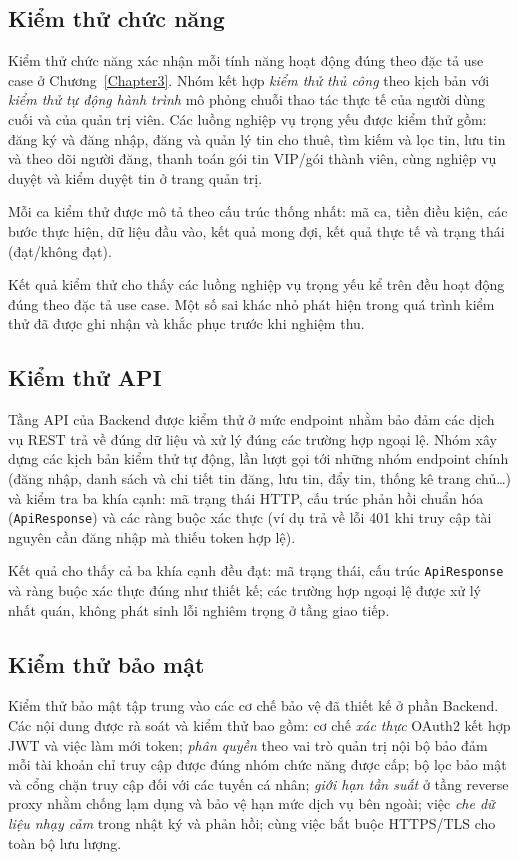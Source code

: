 \FloatBarrier
\subsection{Kiểm thử chức năng}

Kiểm thử chức năng xác nhận mỗi tính năng hoạt động đúng theo đặc tả use case ở Chương~\ref{Chapter3}. Nhóm kết hợp \textit{kiểm thử thủ công} theo kịch bản với \textit{kiểm thử tự động hành trình} mô phỏng chuỗi thao tác thực tế của người dùng cuối và của quản trị viên. Các luồng nghiệp vụ trọng yếu được kiểm thử gồm: đăng ký và đăng nhập, đăng và quản lý tin cho thuê, tìm kiếm và lọc tin, lưu tin và theo dõi người đăng, thanh toán gói tin VIP/gói thành viên, cùng nghiệp vụ duyệt và kiểm duyệt tin ở trang quản trị.

Mỗi ca kiểm thử được mô tả theo cấu trúc thống nhất: mã ca, tiền điều kiện, các bước thực hiện, dữ liệu đầu vào, kết quả mong đợi, kết quả thực tế và trạng thái (đạt/không đạt).

Kết quả kiểm thử cho thấy các luồng nghiệp vụ trọng yếu kể trên đều hoạt động đúng theo đặc tả use case. Một số sai khác nhỏ phát hiện trong quá trình kiểm thử đã được ghi nhận và khắc phục trước khi nghiệm thu.

\FloatBarrier
\subsection{Kiểm thử API}

Tầng API của Backend được kiểm thử ở mức endpoint nhằm bảo đảm các dịch vụ REST trả về đúng dữ liệu và xử lý đúng các trường hợp ngoại lệ. Nhóm xây dựng các kịch bản kiểm thử tự động, lần lượt gọi tới những nhóm endpoint chính (đăng nhập, danh sách và chi tiết tin đăng, lưu tin, đẩy tin, thống kê trang chủ\ldots) và kiểm tra ba khía cạnh: mã trạng thái HTTP, cấu trúc phản hồi chuẩn hóa (\texttt{ApiResponse}) và các ràng buộc xác thực (ví dụ trả về lỗi 401 khi truy cập tài nguyên cần đăng nhập mà thiếu token hợp lệ).

Kết quả cho thấy cả ba khía cạnh đều đạt: mã trạng thái, cấu trúc \texttt{ApiResponse} và ràng buộc xác thực đúng như thiết kế; các trường hợp ngoại lệ được xử lý nhất quán, không phát sinh lỗi nghiêm trọng ở tầng giao tiếp.

\FloatBarrier
\subsection{Kiểm thử bảo mật}

Kiểm thử bảo mật tập trung vào các cơ chế bảo vệ đã thiết kế ở phần Backend. Các nội dung được rà soát và kiểm thử bao gồm: cơ chế \textit{xác thực} OAuth2 kết hợp JWT và việc làm mới token; \textit{phân quyền} theo vai trò quản trị nội bộ bảo đảm mỗi tài khoản chỉ truy cập được đúng nhóm chức năng được cấp; bộ lọc bảo mật và cổng chặn truy cập đối với các tuyến cá nhân; \textit{giới hạn tần suất} ở tầng reverse proxy nhằm chống lạm dụng và bảo vệ hạn mức dịch vụ bên ngoài; việc \textit{che dữ liệu nhạy cảm} trong nhật ký và phản hồi; cùng việc bắt buộc HTTPS/TLS cho toàn bộ lưu lượng.

